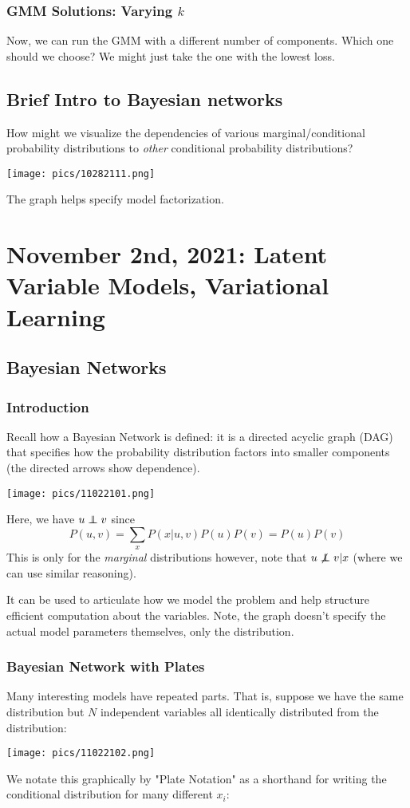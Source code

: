 \documentclass[11pt]{scrartcl}
\begin{document}
\subsubsection{GMM Solutions: Varying $k$}
Now, we can run the GMM with a different number of components. Which one should we choose? We might just take the one with the lowest loss. 

\subsection{Brief Intro to Bayesian networks}
How might we visualize the dependencies of various marginal/conditional probability distributions to \textit{other} conditional probability distributions?
\begin{center}
\texttt{[image: pics/10282111.png]}
\end{center}
The graph helps specify model factorization.

\newpage
\section{November 2nd, 2021: Latent Variable Models, Variational Learning}

\subsection{Bayesian Networks}
\subsubsection{Introduction}
Recall how a Bayesian Network is defined: it is a directed acyclic graph (DAG) that specifies how the probability distribution factors into smaller components (the directed arrows show dependence).
\begin{center}
    \texttt{[image: pics/11022101.png]}
\end{center}
Here, we have $u \perp\!\!\!\!\perp v$ since $$P(u,v)=\sum_{x}P(x|u,v)P(u)P(v)=P(u)P(v)$$ This is only for the \textit{marginal} distributions however, note that $u \not\perp\!\!\!\!\perp v|x$ (where we can use similar reasoning).

It can be used to articulate how we model the problem and help structure efficient computation about the variables. Note, the graph doesn't specify the actual model parameters themselves, only the distribution. 

\subsubsection{Bayesian Network with Plates}
Many interesting models have repeated parts. That is, suppose we have the same distribution but $N$ independent variables all identically distributed from the distribution: 
\begin{center}
    \texttt{[image: pics/11022102.png]}
\end{center} 
We notate this graphically by "Plate Notation" as a shorthand for writing the conditional distribution for many different $x_i$:
\end{document}
